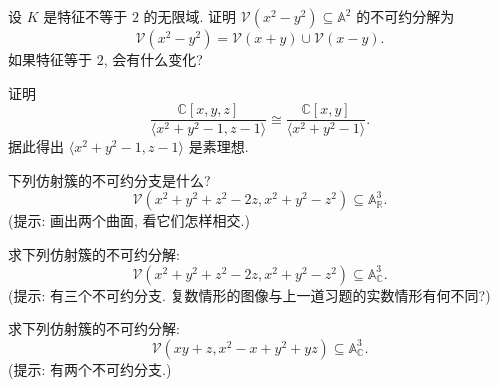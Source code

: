 \BookExerciseHeading
\begin{BookExercises}
  \item\label{ex:irreducible-components-crossing-lines} 设 $K$ 是特征不等于 $2$ 的无限域. 证明 $\mathcal{V}(x^{2}-y^{2})\subseteq\mathbb{A}^{2}$ 的不可约分解为
    \[
      \mathcal{V}(x^{2}-y^{2})=\mathcal{V}(x+y)\cup\mathcal{V}(x-y).
    \]
    如果特征等于 $2$, 会有什么变化?
  \item\label{ex:circle-in-plane-prime-ideal} 证明
    \[
      \frac{\mathbb{C}[x,y,z]}{\langle x^{2}+y^{2}-1,z-1\rangle}
        \cong\frac{\mathbb{C}[x,y]}{\langle x^{2}+y^{2}-1\rangle}.
    \]
    据此得出 $\langle x^{2}+y^{2}-1,z-1\rangle$ 是素理想.
  \item\label{ex:quadric-intersection-real-components} 下列仿射簇的不可约分支是什么?
    \[
      \mathcal{V}(x^{2}+y^{2}+z^{2}-2z,x^{2}+y^{2}-z^{2})
        \subseteq\mathbb{A}^{3}_{\mathbb{R}}.
    \]
    (提示: 画出两个曲面, 看它们怎样相交.)
  \item\label{ex:quadric-intersection-complex-components} 求下列仿射簇的不可约分解:
    \[
      \mathcal{V}(x^{2}+y^{2}+z^{2}-2z,x^{2}+y^{2}-z^{2})
        \subseteq\mathbb{A}^{3}_{\mathbb{C}}.
    \]
    (提示: 有三个不可约分支. 复数情形的图像与上一道习题的实数情形有何不同?)
  \item\label{ex:polynomial-curve-two-irreducible-components} 求下列仿射簇的不可约分解:
    \[
      \mathcal{V}(xy+z,x^{2}-x+y^{2}+yz)\subseteq\mathbb{A}^{3}_{\mathbb{C}}.
    \]
    (提示: 有两个不可约分支.)
\end{BookExercises}
